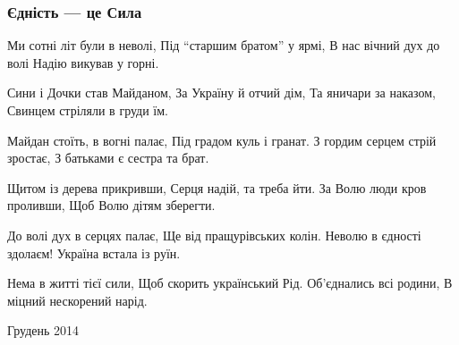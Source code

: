  
 
 

\subsubsection{Єдність — це Сила}

Ми сотні літ були в неволі,
Під “старшим братом” у ярмі,
В нас вічний дух до волі
Надію викував у горні.

Сини і Дочки став Майданом,
За Україну й отчий дім,
Та яничари за наказом,
Свинцем стріляли в груди їм.

Майдан стоїть, в вогні палає,
Під градом куль і гранат.
З гордим серцем стрій зростає,
З батьками є сестра та брат.

Щитом із дерева прикривши,
Серця надій, та треба йти.
За Волю люди кров проливши,
Щоб Волю дітям зберегти.

До волі дух в серцях палає,
Ще від пращурівських колін.
Неволю в єдності здолаєм!
Україна встала із руїн.

Нема в житті тієї сили,
Щоб скорить український Рід.
Об'єднались всі родини,
В міцний нескорений нарід.

Грудень 2014
